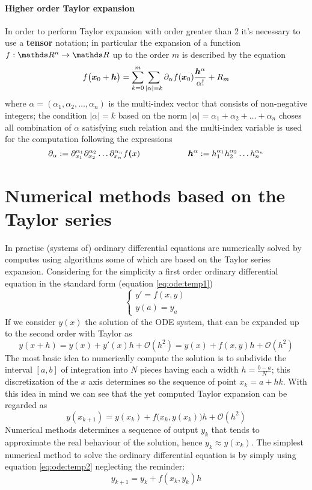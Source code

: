 	\paragraph{Higher order Taylor expansion} In order to perform Taylor expansion with order greater than 2 it's necessary to use a \textbf{tensor} notation; in particular the expansion of a function $f:\R^n\rightarrow \R$ up to the order $m$ is described by the equation
	\begin{equation}
		f\big(\boldsymbol{x}_0 + \boldsymbol{h}\big) = \sum_{k=0}^{m} \sum_{|\alpha|=k} \partial_\alpha f(\boldsymbol{x}_0) \frac{\boldsymbol{h}^\alpha}{\alpha!} + R_m
	\end{equation}
	where $\alpha = (\alpha_1,\alpha_2,\dots,\alpha_n)$ is the multi-index vector that consists of non-negative integers; the condition $|\alpha|=k$ based on the norm $|\alpha| = \alpha_1+\alpha_2+\dots + \alpha_n$ choses all combination of $\alpha$ satisfying such relation and the multi-index variable is used for the computation following the expressions
	\[ \partial_\alpha := \partial_{x_1}^{\alpha_1} \partial_{x_2}^{\alpha_2} \dots \partial_{x_n}^{\alpha_n} f\boldsymbol{(}x) \hspace{2cm} \boldsymbol{h}^\alpha := h_1^{\alpha_1} h_2^{\alpha_2} \dots h_n^{\alpha_n} \]
	
\section{Numerical methods based on the Taylor series}
	In practise (systems of) ordinary  differential equations are numerically solved by computes using algorithms some of which are based on the Taylor series expansion. Considering for the simplicity a first order ordinary differential equation in the standard form (equation \ref{eq:ode:temp1})
	\[ \begin{cases}
		y' = f(x,y) \\ y(a) = y_a
	\end{cases} \]
	If we consider $y(x)$ the solution of the ODE system, that can be expanded up to the second order with Taylor as
	\[ y(x+h) = y(x) + y'(x) h + \mathcal O (h^2) = y(x) + f(x,y) h + \mathcal O (h^2) \]
	The most basic idea to numerically compute the solution is to subdivide the interval $[a,b]$ of integration into $N$ pieces having each a width $h = \frac{b-a}{N}$; this discretization of the $x$ axis determines so the sequence of point $x_k = a + h k$. With this idea in mind we can see that the yet computed Taylor expansion can be regarded as
	\begin{equation} \label{eq:ode:temp2}
		y(x_{k+1}) = y(x_k) + f\big(x_k, y(x_k)\big) h + \mathcal O(h^2)
	\end{equation}
	Numerical methods determines a sequence of output $y_k$ that tends to approximate the real behaviour of the solution, hence $y_k \approx y(x_k)$. The simplest numerical method to solve the ordinary differential equation is by simply using  equation \ref{eq:ode:temp2} neglecting the reminder:
	\begin{equation} \label{eq:ode:expliciteuler}
		y_{k+1} = y_k + f(x_k,y_k) h 
	\end{equation}
	
